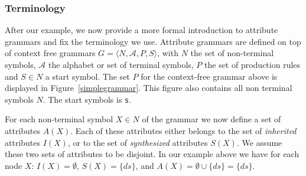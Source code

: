 \subsubsection{Terminology}
% 
After our example, we now provide a more formal introduction to attribute grammars and fix the terminology we use. 
%
Attribute grammars are defined on top of 
context free grammars
 $G=\langle  N, \mathcal{A}, P, S\rangle$, with $N$ the set of non-terminal symbols,  $\mathcal{A}$ the alphabet or set of terminal symbols, 
$P$ the set of production rules and $S\in N$ a start symbol. 
The set $P$ for the context-free grammar above is displayed in Figure~\ref{simplegrammar}.
This figure also contains all non terminal symbols $N$.
The start symbols is \texttt{s}.

For each non-terminal symbol $X\in N$  of the grammar we now define
 a set of attributes $A(X)$. %
%
Each of these attributes either belongs to the set of \emph{inherited} attributes $I(X)$, or to the set of \emph{synthesized} attributes $S(X)$.
We assume these two sets of attributes to be disjoint. %
In our example above we have for each node $X$: $I(X)=\emptyset$, $S(X)=\{\textit{ds}\}$, and $A(X)=\emptyset\cup\{\textit{ds}\}=\{\textit{ds}\}$.
%

